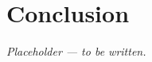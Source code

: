\documentclass[conference, a4paper]{IEEEtran}
\begin{document}
\section{Conclusion}
\label{sec:conclusion}


\textit{Placeholder — to be written.}




\end{document}
